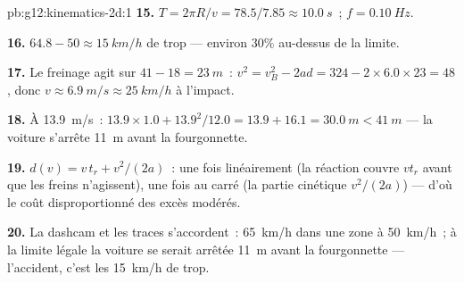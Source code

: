 \begin{solution}{pb:g12:kinematics-2d:1}
\textbf{15.} $T = 2\pi R/v = 78.5/7.85 \approx \qty{10.0}{s}$~;
$f = \qty{0.10}{Hz}$.

\textbf{16.} $64.8 - 50 \approx \qty{15}{km/h}$ de trop --- environ
$30\%$ au-dessus de la limite.

\textbf{17.} Le freinage agit sur $41 - 18 = \qty{23}{m}$~:
$v^2 = v_B^2 - 2ad = 324 - 2 \times 6.0 \times 23 = 48$, donc
$v \approx \qty{6.9}{m/s} \approx \qty{25}{km/h}$ à l'impact.

\textbf{18.} À \qty{13.9}{m/s}~: $13.9 \times 1.0 + 13.9^2/12.0 =
13.9 + 16.1 = \qty{30.0}{m} < \qty{41}{m}$ --- la voiture s'arrête
\qty{11}{m} avant la fourgonnette.

\textbf{19.} $d(v) = v\,t_r + v^2/(2a)$~: une fois linéairement (la
réaction couvre $v t_r$ avant que les freins n'agissent), une fois au
carré (la partie cinétique $v^2/(2a)$) --- d'où le coût
disproportionné des excès modérés.

\textbf{20.} La dashcam et les traces s'accordent~: \qty{65}{km/h} dans
une zone à \qty{50}{km/h}~; à la limite légale la voiture se serait
arrêtée \qty{11}{m} avant la fourgonnette --- l'accident, c'est les
\qty{15}{km/h} de trop.
\end{solution}
